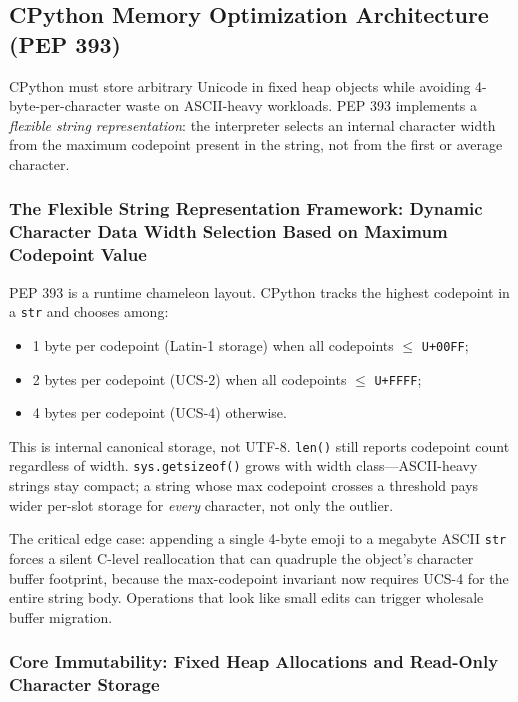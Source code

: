 \subsection{CPython Memory Optimization Architecture (PEP 393)}

CPython must store arbitrary Unicode in fixed heap objects while avoiding 4-byte-per-character waste on ASCII-heavy workloads. PEP 393 implements a \emph{flexible string representation}: the interpreter selects an internal character width from the maximum codepoint present in the string, not from the first or average character.

\subsubsection{The Flexible String Representation Framework: Dynamic Character Data Width Selection Based on Maximum Codepoint Value}

PEP 393 is a runtime chameleon layout. CPython tracks the highest codepoint in a \texttt{str} and chooses among:

\begin{itemize}
    \item 1 byte per codepoint (Latin-1 storage) when all codepoints $\leq$ \texttt{U+00FF};
    \item 2 bytes per codepoint (UCS-2) when all codepoints $\leq$ \texttt{U+FFFF};
    \item 4 bytes per codepoint (UCS-4) otherwise.
\end{itemize}

This is internal canonical storage, not UTF-8. \texttt{len()} still reports codepoint count regardless of width. \texttt{sys.getsizeof()} grows with width class---ASCII-heavy strings stay compact; a string whose max codepoint crosses a threshold pays wider per-slot storage for \emph{every} character, not only the outlier.

The critical edge case: appending a single 4-byte emoji to a megabyte ASCII \texttt{str} forces a silent C-level reallocation that can quadruple the object's character buffer footprint, because the max-codepoint invariant now requires UCS-4 for the entire string body. Operations that look like small edits can trigger wholesale buffer migration.

\subsubsection{Core Immutability: Fixed Heap Allocations and Read-Only Character Storage}

